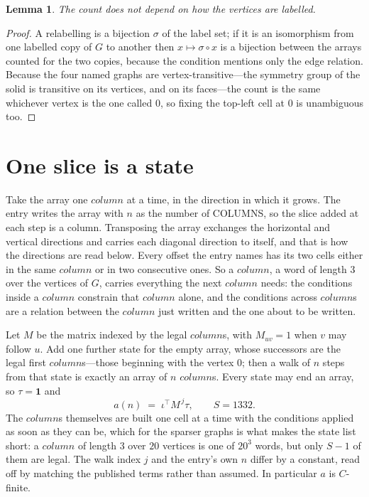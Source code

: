 \documentclass[11pt,a4paper]{article}
\theoremstyle{plain}
\newtheorem{lemma}[theorem]{Lemma}
\theoremstyle{definition}
\begin{document}
\begin{lemma}\label{lem:label}
The count does not depend on how the vertices are labelled.
\end{lemma}

\begin{proof}
A relabelling is a bijection $\sigma$ of the label set; if it is an isomorphism from one
labelled copy of $G$ to another then $x\mapsto\sigma\circ x$ is a bijection between the arrays
counted for the two copies, because the condition mentions only the edge relation.
Because the four named graphs are vertex-transitive---the symmetry group of the solid is transitive on its vertices, and on its faces---the count is the same whichever vertex is the one called $0$, so fixing the top-left cell at $0$ is unambiguous too.
\end{proof}

\section{One slice is a state}

Take the array one $column$ at a time, in the direction in which it grows. The entry writes the array with $n$ as the number of COLUMNS, so the slice added at each step is a column. Transposing the array exchanges the horizontal and vertical directions and carries each diagonal direction to itself, and that is how the directions are read below.
Every offset the entry names has its two cells either in the same $column$ or in two
consecutive ones. So a $column$, a word of length $3$ over the vertices of $G$, carries
everything the next $column$ needs: the conditions inside a $column$ constrain that
$column$ alone, and the conditions across $column$s are a relation between the
$column$ just written and the one about to be written.

Let $M$ be the matrix indexed by the legal $column$s, with $M_{uv}=1$ when $v$ may
follow $u$. Add one further state for the empty array, whose successors are the legal first
$column$s---those beginning with the vertex $0$; then a walk of
$n$ steps from that state is exactly an array of $n$ $column$s. Every state may end an
array, so $\tau=\mathbf{1}$ and
\[
a(n)\;=\;\iota^{\!\top}M^{\,j}\tau ,\qquad S=1332.
\]
The $column$s themselves are built one cell at a time with the conditions applied as soon
as they can be, which for the sparser graphs is what makes the state list short: a $column$
of length $3$ over $20$ vertices is one of $20^{3}$ words, but only $S-1$ of them are
legal. The walk index $j$ and the entry's own $n$ differ by a constant, read off by matching the
published terms rather than assumed. In particular $a$ is $C$-finite.
\end{document}
